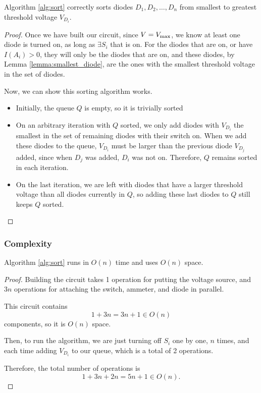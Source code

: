\documentclass{article}
\begin{document}
\begin{theorem}
	Algorithm \ref{alg:sort} correctly sorts diodes $D_1, D_2, \dots, D_n$ from
	smallest to greatest threshold voltage $V_{D_i}$.
\end{theorem}
\begin{proof}
	Once we have built our circuit, since $V = V_\text{max}$, we know at least one
	diode is turned on, as long as $\exists S_i$ that is on.
	For the diodes that are on, or have $I(A_i) > 0$, they will only be the
	diodes that are on, and these diodes, by Lemma \ref{lemma:smallest_diode},
	are the ones with the smallest threshold voltage in the set of diodes.

	Now, we can show this sorting algorithm works.

	\begin{itemize}
		\item Initially, the queue $Q$ is empty, so it is trivially sorted
		\item On an arbitrary iteration with $Q$ sorted, we only add diodes
		with $V_{D_i}$ the smallest in the set of remaining diodes with their switch on.
		When we add these diodes to the queue, $V_{D_i}$ must be larger than the
		previous diode $V_{D_j}$ added, since when $D_j$ was added, $D_i$ was not on.
		Therefore, $Q$ remains sorted in each iteration.
		\item On the last iteration, we are left with diodes that have a larger threshold voltage than all diodes currently in $Q$,
		so adding these last diodes to $Q$ still keeps $Q$ sorted.
	\end{itemize}
\end{proof}

\subsubsection{Complexity}

\begin{theorem}
	Algorithm \ref{alg:sort} runs in $O(n)$ time and uses $O(n)$ space.
\end{theorem}

\begin{proof}
	Building the circuit takes 1 operation for putting the voltage source, and $3n$ operations for
	attaching the switch, ammeter, and diode in parallel.

	This circuit contains
	\begin{equation}
		1 + 3n  = 3n + 1 \in O(n)
	\end{equation}
	components, so it is $O(n)$ space.

	Then, to run the algorithm, we are just turning off $S_i$ one by one, $n$
	times, and each time adding $V_{D_i}$ to our queue, which is a total of 2
	operations.

	Therefore, the total number of operations is
	\begin{equation}
		1 + 3n + 2n = 5n+1 \in O(n).
	\end{equation}
\end{proof}
\end{document}
